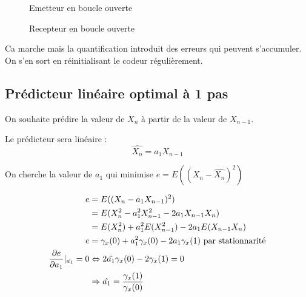 \documentclass[main.tex]{subfiles}
\begin{document}
\begin{figure}[H]
  \centering
  \caption{Emetteur en boucle ouverte}
\end{figure}
\begin{figure}[H]
  \centering
  \caption{Recepteur en boucle ouverte}
\end{figure}

Ca marche mais la quantification introduit des erreurs qui peuvent s'accumuler. On s'en sort en réinitialisant le codeur régulièrement.


\subsection{Prédicteur linéaire optimal à 1 pas}

On souhaite prédire la valeur de $X_n$ à partir de la valeur de $X_{n-1}$.

Le prédicteur sera linéaire :
\[\hat{X_n} = a_1 X_{n-1} \]

On cherche la valeur de $a_1$ qui minimise $e = E((X_n-\hat{X_n})^2)$

\begin{align*}
e & = E((X_n-a_1X_{n-1})^2) \\
& = E(X_n^2 -a_1^2 X_{n-1}^2 - 2a_1X_{n-1}X_n) \\
& = E(X_n^2) + a_1^2E(X_{n-1}^2) - 2a_1E(X_{n-1}X_n)\\
e & = \gamma_x(0) + a_1^2 \gamma_x(0) - 2a_1 \gamma_x(1)  \text{ par stationnarité}\\
\derivp[e]{a_1}|_{\hat{a_1}} = 0 & \Leftrightarrow 2 \hat{a_1} \gamma_x(0) - 2 \gamma_x(1) = 0\\
& \Rightarrow \hat{a_1} = \frac{\gamma_x(1)}{\gamma_x(0)}
\end{align*}
\end{document}
